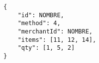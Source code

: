 \begin{lstlisting}
{
	"id": NOMBRE,
	"method": 4,
	"merchantId": NOMBRE,
	"items": [11, 12, 14],
	"qty": [1, 5, 2]
}	
\end{lstlisting}
